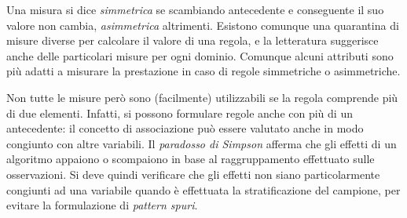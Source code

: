 \documentclass[11pt, a4page, twocolumn]{article}
\begin{document}
Una misura si dice \textit{simmetrica} se scambiando antecedente e conseguente il suo valore non cambia, \textit{asimmetrica} altrimenti.
Esistono comunque una quarantina di misure diverse per calcolare il valore di una regola, e la letteratura suggerisce anche delle particolari misure per ogni dominio.
Comunque alcuni attributi sono più adatti a misurare la prestazione in caso di regole simmetriche o asimmetriche. \newline

Non tutte le misure però sono (facilmente) utilizzabili se la regola comprende più di due elementi.
Infatti, si possono formulare regole anche con più di un antecedente: il concetto di associazione può essere valutato anche in modo congiunto con altre variabili.
Il \textit{paradosso di Simpson} afferma che gli effetti di un algoritmo appaiono o scompaiono in base al raggruppamento effettuato sulle osservazioni.
Si deve quindi verificare che gli effetti non siano particolarmente congiunti ad una variabile quando è effettuata la stratificazione del campione, per evitare la formulazione di \textit{pattern spuri}.
\end{document}
